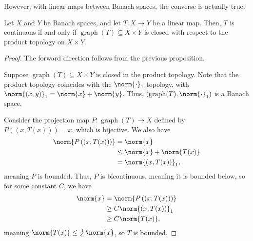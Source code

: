 \documentclass[10pt]{mypackage}
\DeclareMathOperator{\Graph}{graph}
\begin{document}
  However, with linear maps between Banach spaces, the converse is actually true.
  \begin{theorem}
    Let $X$ and $Y$ be Banach spaces, and let $T: X\rightarrow Y$ be a linear map. Then, $T$ is continuous if and only if $\Graph(T) \subseteq X\times Y$ is closed with respect to the product topology on $X\times Y$.
  \end{theorem}
  \begin{proof}
    The forward direction follows from the previous proposition.\newline

    Suppose $\Graph(T)\subseteq X\times Y$ is closed in the product topology. Note that the product topology coincides with the $\norm{\cdot}_1$ topology, with $\norm{\left(x,y\right)}_{1} = \norm{x} + \norm{y}$. Thus, $\left(\Graph(T),\norm{\cdot}_1\right)$ is a Banach space.\newline

    Consider the projection map $P: \Graph(T) \rightarrow X$ defined by $P\left(\left(x,T(x)\right)\right) = x$, which is bijective. We also have
    \begin{align*}
      \norm{P\left(\left(x,T(x)\right)\right)} &= \norm{x}\\
                                               &\leq \norm{x} + \norm{T(x)}\\
                                               &= \norm{\left(x,T(x)\right)}_{1},
    \end{align*}
    meaning $P$ is bounded. Thus, $P$ is bicontinuous, meaning it is bounded below, so for some constant $C$, we have
    \begin{align*}
      \norm{x} &= \norm{P\left(\left(x,T(x)\right)\right)}\\
               &\geq C\norm{\left(x,T(x)\right)}_{1}\\
               &\geq C\norm{T(x)},
    \end{align*}
    meaning $\norm{T(x)}\leq \frac{1}{C}\norm{x}$, so $T$ is bounded.
  \end{proof}
\end{document}
